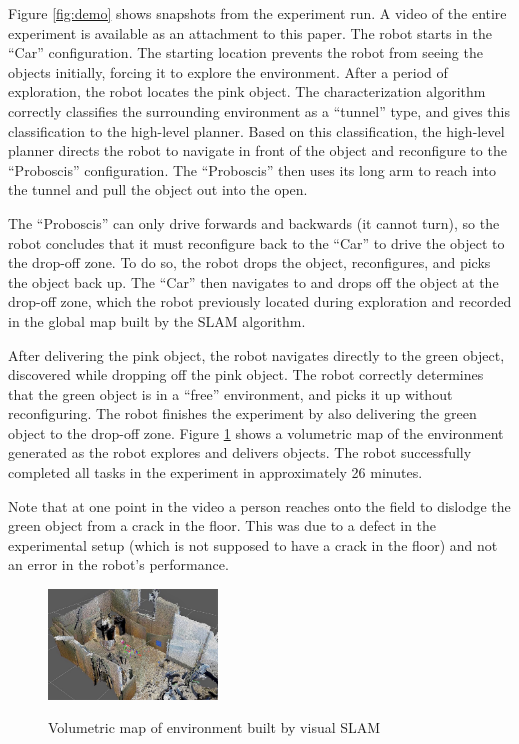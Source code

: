 \documentclass[journal]{IEEEtran}
\begin{document}
%
Figure \ref{fig:demo} shows snapshots from the experiment run. A video of the entire experiment is available as an attachment to this paper. The robot starts in the ``Car'' configuration. The starting location prevents the robot from seeing the objects initially, forcing it to explore the environment. After a period of exploration, the robot locates the pink object. The characterization algorithm correctly classifies the surrounding environment as a ``tunnel'' type, and gives this classification to the high-level planner. Based on this classification, the high-level planner directs the robot to navigate in front of the object and reconfigure to the ``Proboscis'' configuration. The ``Proboscis'' then uses its long arm to reach into the tunnel and pull the object out into the open.

 The ``Proboscis'' can only drive forwards and backwards (it cannot turn), so the robot concludes that it must reconfigure back to the ``Car'' to drive the object to the drop-off zone.  To do so, the robot drops the object, reconfigures, and picks the object back up. The ``Car'' then navigates to and drops off the object at the drop-off zone, which the robot previously located during exploration and recorded in the global map built by the SLAM algorithm.

After delivering the pink object, the robot navigates directly to the green object, discovered while dropping off the pink object. The robot correctly determines that the green object is in a ``free'' environment, and picks it up without reconfiguring. The robot finishes the experiment by also delivering the green object to the drop-off zone. Figure \ref{fig:octomap} shows a volumetric map of the environment generated as the robot explores and delivers objects. The robot successfully completed all tasks in the experiment in approximately 26 minutes.

Note that at one point in the video a person reaches onto the field to dislodge the green object from a crack in the floor.  This was due to a defect in the experimental setup (which is not supposed to have a crack in the floor) and not an error in the robot's performance.
%
\begin{figure}
\begin{center}
\includegraphics[width=0.4\textwidth]{images/map4.jpg}
\caption{Volumetric map of environment built by visual SLAM}
\vspace{-2em}
\label{fig:octomap}
\end{center}
\end{figure}
\end{document}
